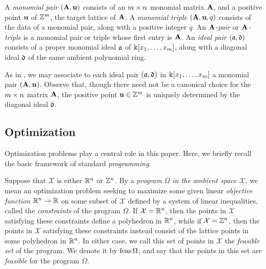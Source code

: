 \documentclass{article}
\begin{document}
\begin{definition}
\label{pairs: D}
A \emph{monomial pair} $(\mathbf{A}, \mathbf{u})$ consists of an $m \times n$ monomial matrix $\mathbf{A}$, and a positive point $\mathbf{u}$ of $\mathbb{Z}^m$, the target lattice of $\mathbf{A}$.
A \emph{monomial triple} $(\mathbf{A},\mathbf{u},q)$ consists of the data of a monomial pair, along with a positive integer $q$.
    An \emph{$\mathbf{A}$-pair} or \emph{$\mathbf{A}$-triple} is a monomial pair or triple whose first entry is $\mathbf{A}$.
   An \emph{ideal pair} $(\mathfrak{a}, \mathfrak{d})$ consists of a proper monomial ideal $\mathfrak{a}$ of $\Bbbk[x_1, \ldots, x_{m}]$, along with a diagonal ideal $\mathfrak{d}$ of the same ambient polynomial ring.
\end{definition}

\begin{remark}
\label{associate of pairs: R}
 As in , we may associate to each ideal pair $(\mathfrak{a}, \mathfrak{d})$ in $\Bbbk[x_1, \ldots, x_{m}]$ a monomial pair $(\mathbf{A}, \mathbf{u})$.  Observe that, though there need not be a canonical choice for the $m \times n$ matrix $\mathbf{A}$, the positive point $\mathbf{u} \in \mathbb{Z}^m$ is uniquely determined by the diagonal ideal $\mathfrak{d}$.
\end{remark}

\subsection{Optimization} \label{optimization: S}  Optimization problems play a central role in this paper.  Here, we briefly recall the basic framework of standard \emph{programming}.

Suppose that $\mathcal{X}$ is either $\mathbb{R}^n$ or $\mathbb{Z}^n$.  By a \emph{program $\Omega$ in the ambient space $\mathcal{X}$}, we mean an optimization problem seeking to maximize some given linear \emph{objective function} $\mathbb{R}^n \to \mathbb{R}$ on some subset of $\mathcal{X}$ defined by a system of linear inequalities, called the \emph{constraints} of the program $\Omega$. If $\mathcal{X} = \mathbb{R}^n$, then the points in $\mathcal{X}$ satisfying these constraints define a polyhedron in $\mathbb{R}^n$, while if $\mathcal{X} = \mathbb{Z}^n$, then the points in $\mathcal{X}$ satisfying these constraints instead consist of the lattice points in some polyhedron in $\mathbb{R}^n$.  In either case, we call this set of points in $\mathcal{X}$ the \emph{feasible set} of the program.  We denote it by $\operatorname{feas} \Omega$, and say that the points in this set are \emph{feasible} for the program $\Omega$.
\end{document}
